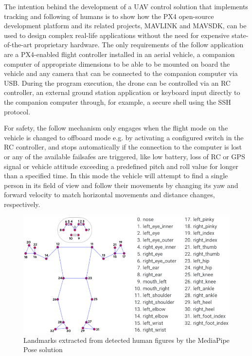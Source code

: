 The intention behind the development of a UAV control solution that implements tracking and following of humans is to show how the PX4 open-source development platform and its related projects, MAVLINK and MAVSDK, can be used to design complex real-life applications without the need for expensive state-of-the-art proprietary hardware.
The only requirements of the follow application are a PX4-enabled flight controller installed in an aerial vehicle, a companion computer of appropriate dimensions to be able to be mounted on board the vehicle and any camera that can be connected to the companion computer via USB.
During the program execution, the drone can be controlled via an RC controller, an external ground station application or keyboard input directly to the companion computer through, for example, a secure shell using the SSH protocol.

For safety, the follow mechanism only engages when the flight mode on the vehicle is changed to offboard mode e.g. by activating a configured switch in the RC controller, and stops automatically if the connection to the computer is lost or any of the available failsafes are triggered, like low battery, loss of RC or GPS signal or vehicle attitude exceeding a predefined pitch and roll value for longer than a specified time.
In this mode the vehicle will attempt to find a single person in its field of view and follow their movements by changing its yaw and forward velocity to match horizontal movements and distance changes, respectively.

\begin{figure}
  \centering
  \includegraphics[width=\textwidth, keepaspectratio]{img/pose-landmarks.png}
  \caption{Landmarks extracted from detected human figures by the MediaPipe Pose solution}\label{fig:pose-landmarks}
\end{figure}


